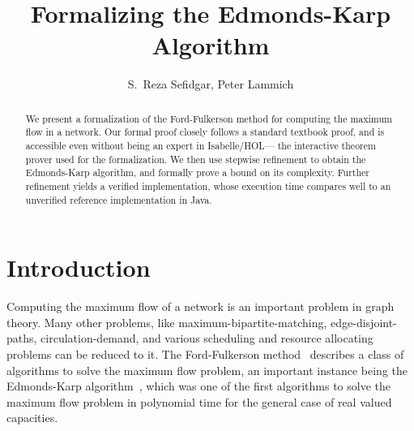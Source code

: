 \documentclass{llncs}
\begin{document}
\title{Formalizing the Edmonds-Karp Algorithm}

\author{S.~Reza Sefidgar, Peter Lammich}


\maketitle
\begin{abstract}
We present a formalization of the Ford-Fulkerson method for computing the maximum flow in a network.
Our formal proof closely follows a standard textbook proof, and is accessible even without being
an expert in Isabelle/HOL--- the interactive theorem prover used for the formalization.
We then use stepwise refinement to obtain the Edmonds-Karp algorithm, and formally prove a bound on its complexity.
Further refinement yields a verified implementation, whose execution time compares well to an unverified reference implementation in Java.



% 
% 
\end{abstract}

\section{Introduction}
Computing the maximum flow of a network is an important problem in graph theory.
Many other problems, like maximum-bipartite-matching, edge-disjoint-paths, circulation-demand, and various scheduling and resource allocating problems can be reduced to it.
The Ford-Fulkerson method~\cite{FF56} describes a class of algorithms to solve the maximum flow problem, an important instance being the Edmonds-Karp algorithm~\cite{EK72},
which was one of the first algorithms to solve the maximum flow problem in polynomial time for the general case of real valued capacities.
\end{document}
